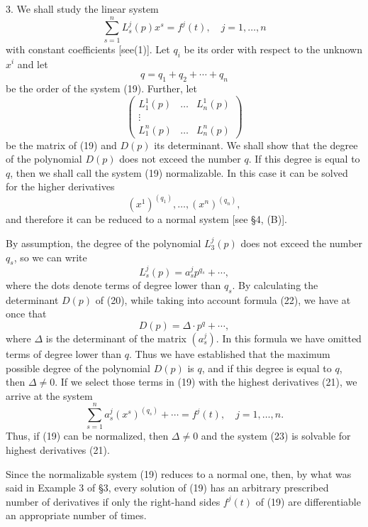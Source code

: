\documentclass[10pt,a5paper]{book}
\theoremstyle{plain}
\theoremstyle{definition}
\theoremstyle{remark}
\begin{document}
3. We shall study the linear system
\begin{equation*}
\sum_{s=1}^{n} L_{s}^{j}(p) x^{s}=f^{j}(t), \quad j=1, \ldots, n \tag{19}
\end{equation*}
with constant coefficients [see(1)]. Let $q_{i}$ be its order with respect to the unknown $x^{i}$ and let
\[
q=q_{1}+q_{2}+\cdots+q_{n}
\]
be the order of the system (19). Further, let
\[
\left(\begin{array}{ccc}
L_{1}^{1}(p) & \ldots & L_{n}^{1}(p)  \tag{20}\\
\vdots & & \\
L_{1}^{n}(p) & \ldots & L_{n}^{n}(p)
\end{array}\right)
\]
be the matrix of (19) and $D(p)$ its determinant. We shall show that the degree of the polynomial $D(p)$ does not exceed the number $q$. If this degree is equal to $q$, then we shall call the system (19) normalizable. In this case it can be solved for the higher derivatives
\begin{equation*}
\left(x^{1}\right)^{\left(q_{1}\right)}, \ldots,\left(x^{n}\right)^{\left(q_{n}\right)}, \tag{21}
\end{equation*}
and therefore it can be reduced to a normal system [see §4, (B)].

By assumption, the degree of the polynomial $L_{3}^{j}(p)$ does not exceed the number $q_{s}$, so we can write
\begin{equation*}
L_{s}^{j}(p)=a_{s}^{j} p^{q_{s}}+\cdots, \tag{22}
\end{equation*}
where the dots denote terms of degree lower than $q_{s}$. By calculating the determinant $D(p)$ of (20), while taking into account formula (22), we have at once that
\[
D(p)=\Delta \cdot p^{q}+\cdots,
\]
where $\Delta$ is the determinant of the matrix $\left(a_{s}^{j}\right)$. In this formula we have omitted terms of degree lower than $q$. Thus we have established that the maximum possible degree of the polynomial $D(p)$ is $q$, and if this degree is equal to $q$, then $\Delta \neq 0$. If we select those terms in (19) with the highest derivatives (21), we arrive at the system
\begin{equation*}
\sum_{s=1}^{n} a_{s}^{j}\left(x^{s}\right)^{\left(q_{s}\right)}+\cdots=f^{j}(t), \quad j=1, \ldots, n . \tag{23}
\end{equation*}
Thus, if (19) can be normalized, then $\Delta \neq 0$ and the system (23) is solvable for highest derivatives (21).

Since the normalizable system (19) reduces to a normal one, then, by what was said in Example 3 of §3, every solution of (19) has an arbitrary prescribed number of derivatives if only the right-hand sides $f^{j}(t)$ of (19) are differentiable an appropriate number of times.
\end{document}

